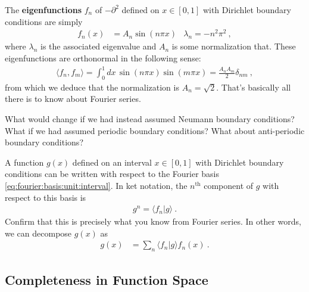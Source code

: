 \begin{example}\label{ex:eigenfunction:fourier}
The \textbf{eigenfunctions} $f_n$ of $-\partial^2$ defined on $x\in [0,1]$ with Dirichlet boundary conditions are simply 
\begin{align}
	f_n(x) &= A_n \sin(n\pi x) 
	&
	\lambda_n = - n^2\pi^2 \ ,
	\label{eq:fourier:basis:unit:interval}
\end{align}
where $\lambda_n$ is the associated eigenvalue and $A_n$ is some normalization that. These eigenfunctions are orthonormal in the following sense:
\begin{align}
	\langle f_n, f_m\rangle = \int_0^1 dx\, \sin(n\pi x)\sin(m\pi x) = \frac{A_nA_m}{2} \delta_{nm} \ ,
\end{align}
from which we deduce that the normalization is $A_n = \sqrt{2}$. That's basically all there is to know about Fourier series.
\end{example}
\begin{exercise}
What would change if we had instead assumed Neumann boundary conditions? What if we had assumed periodic boundary conditions? What about anti-periodic boundary conditions?
\end{exercise}
\begin{exercise}\label{exe:eigenfunction:fourier}
A function $g(x)$ defined on an interval $x\in [0,1]$ with Dirichlet boundary conditions can be written with respect to the Fourier basis \eqref{eq:fourier:basis:unit:interval}. In ket notation, the $n^\text{th}$ component of $g$ with respect to this basis is
\begin{align}
	g^n = \langle f_n| g\rangle \ .
\end{align}
Confirm that this is precisely what you know from Fourier series. In other words, we can decompose $g(x)$ as
\begin{align}
	g(x) &= \sum_n \langle f_n| g\rangle f_n(x)  \ .
\end{align}
\end{exercise}


\subsection{Completeness in Function Space}

